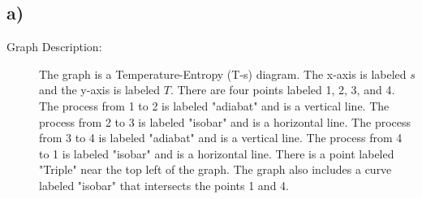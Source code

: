 

\subsection*{a)}

\begin{description}
    \item[Graph Description:] The graph is a Temperature-Entropy (T-s) diagram. The x-axis is labeled $s$ and the y-axis is labeled $T$. There are four points labeled 1, 2, 3, and 4. The process from 1 to 2 is labeled "adiabat" and is a vertical line. The process from 2 to 3 is labeled "isobar" and is a horizontal line. The process from 3 to 4 is labeled "adiabat" and is a vertical line. The process from 4 to 1 is labeled "isobar" and is a horizontal line. There is a point labeled "Triple" near the top left of the graph. The graph also includes a curve labeled "isobar" that intersects the points 1 and 4.
\end{description}